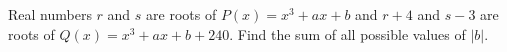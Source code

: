 Real numbers $r$ and $s$ are roots of $P(x)=x^{3}+ax+b$ and $r+4$ and $s-3$ are roots of $Q(x)=x^{3}+ax+b+240$. Find the sum of all possible values of $|b|$.
